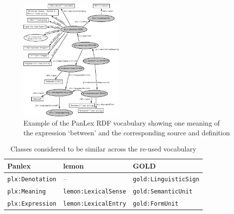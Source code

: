 \documentclass[sw]{iosart2c}
\begin{document}
\begin{figure}
\includegraphics[width=0.46\textwidth]{images/pdf/ontology_new3.pdf}
\caption{Example of the PanLex RDF vocabulary showing one meaning of the expression `between' and the corresponding source and definition}
\label{fig:vocabulary}
\end{figure}

\begin{table}
  \centering\begin{scriptsize}
  \begin{tabular}{p{48px}p{62px}p{70px}}
    Panlex                  & lemon                       & GOLD \\
    \midrule
    \texttt{plx:Denotation} & --                          & \texttt{gold:LinguisticSign} \\
    \texttt{plx:Meaning}    & \texttt{lemon:LexicalSense} & \texttt{gold:SemanticUnit} \\
    \texttt{plx:Expression} & \texttt{lemon:LexicalEntry} & \texttt{gold:FormUnit} \\
  \end{tabular}
  \end{scriptsize}
  \caption{Classes considered to be similar across the re-used vocabulary}
  \label{tbl:sameclasses}
\end{table}
\end{document}
